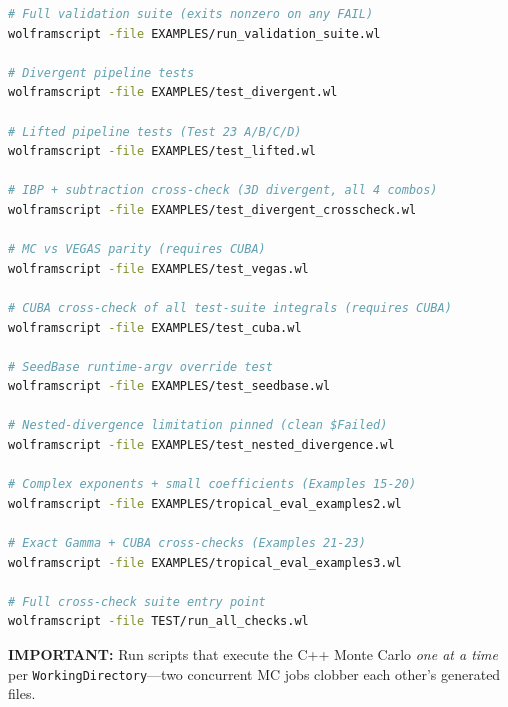 \documentclass[11pt,a4paper]{article}
\begin{document}
\begin{lstlisting}[language=bash]
# Full validation suite (exits nonzero on any FAIL)
wolframscript -file EXAMPLES/run_validation_suite.wl

# Divergent pipeline tests
wolframscript -file EXAMPLES/test_divergent.wl

# Lifted pipeline tests (Test 23 A/B/C/D)
wolframscript -file EXAMPLES/test_lifted.wl

# IBP + subtraction cross-check (3D divergent, all 4 combos)
wolframscript -file EXAMPLES/test_divergent_crosscheck.wl

# MC vs VEGAS parity (requires CUBA)
wolframscript -file EXAMPLES/test_vegas.wl

# CUBA cross-check of all test-suite integrals (requires CUBA)
wolframscript -file EXAMPLES/test_cuba.wl

# SeedBase runtime-argv override test
wolframscript -file EXAMPLES/test_seedbase.wl

# Nested-divergence limitation pinned (clean $Failed)
wolframscript -file EXAMPLES/test_nested_divergence.wl

# Complex exponents + small coefficients (Examples 15-20)
wolframscript -file EXAMPLES/tropical_eval_examples2.wl

# Exact Gamma + CUBA cross-checks (Examples 21-23)
wolframscript -file EXAMPLES/tropical_eval_examples3.wl

# Full cross-check suite entry point
wolframscript -file TEST/run_all_checks.wl
\end{lstlisting}

\textbf{IMPORTANT:} Run scripts that execute the C++ Monte Carlo \emph{one at a time} per \texttt{WorkingDirectory}---two concurrent MC jobs clobber each other's generated files.
\end{document}

